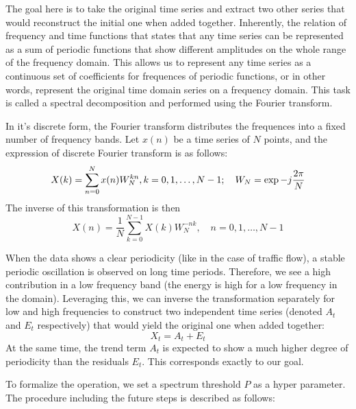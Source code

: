 The goal here is to take the original time series and extract two other series
that would reconstruct the initial one when added together. Inherently, the
relation of frequency and time functions that states that any time series can be
represented as a sum of periodic functions that show different amplitudes on the
whole range of the frequency domain. This allows us to represent any time series
as a continuous set of coefficients for frequences of periodic functions, or in
other words, represent the original time domain series on a frequency domain.
This task is called a spectral decomposition and performed using the Fourier
transform.

In it's discrete form, the Fourier transform distributes the frequences into a
fixed number of frequency bands. Let $x(n)$ be a time series of $N$ points, and 
the expression of discrete Fourier transform is as follows:
\begin{equation}
	X(k)=\sum_{n=0}^Nx(n)W_N^{kn},\space k=0,1,\ldots,N-1;\quad W_N=\exp{-j\frac{2\pi}{N}}
	\label{eq:X_k}
\end{equation}
The inverse of this transformation is then
\begin{equation}
	X(n)=\frac{1}{N}\sum_{k=0}^{N-1}X(k)W_N^{-nk},\quad n=0,1,\ldots,N-1
	\label{eq:X_n}
\end{equation}

When the data shows a clear periodicity (like in the case of traffic flow), a
stable periodic oscillation is observed on long time periods. Therefore, we see
a high contribution in a low frequency band (the energy is high for a low
frequency in the domain). Leveraging this, we can inverse the
transformation separately for low and high frequencies to construct two
independent time series (denoted $A_t$ and $E_t$ respectively) that would yield 
the original one when added together:
\begin{equation}
	X_t=A_t+E_t
	\label{X_t}
\end{equation}
At the same time, the trend term $A_t$ is expected to show a much higher degree 
of periodicity than the residuals $E_t$. This corresponds exactly to our goal.

To formalize the operation, we set a spectrum threshold $P$ as a hyper
parameter. The procedure including the future steps is described as follows:

